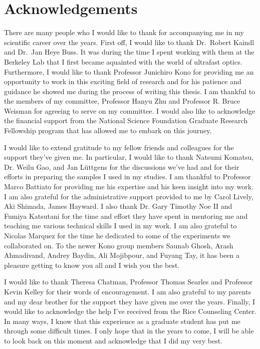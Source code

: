 \chapter*{Acknowledgements}

There are many people who I would like to thank for accompanying me in my scientific career over the years. First off, I would like to thank Dr.\ Robert Kaindl and Dr.\ Jan Heye Buss. It was during the time I spent working with them at the Berkeley Lab that I first became aquainted with the world of ultrafast optics. Furthermore, I would like to thank Professor Junichiro Kono for providing me an opportunity to work in this exciting field of research and for his patience and guidance he showed me during the process of writing this thesis. I am thankful to the members of my committee, Professor Hanyu Zhu and Professor R. Bruce Weisman for agreeing to serve on my committee. I would also like to acknowledge the financial support from the National Science Foundation Graduate Research Fellowship program that has allowed me to embark on this journey.

I would like to extend gratitude to my fellow friends and colleagues for the support they've given me. In particular, I would like to thank Natsumi Komatsu, Dr. Weilu Gao, and Jan L{\"u}ttgens for the discussions we've had and for their efforts in preparing the samples I used in my studies. I am thankful to Professor Marco Battiato for providing me his expertise and his keen insight into my work. I am also grateful for the administrative support provided to me by Carol Lively, Aki Shimada, James Hayward. I also thank Dr. Gary Timothy Noe II and Fumiya Katsutani for the time and effort they have spent in mentoring me and teaching me various technical skills I used in my work. I am also grateful to Nicolas Marquez for the time he dedicated to some of the experiments we collaborated on. To the newer Kono group members Saunab Ghosh, Arash Ahmadivand, Andrey Baydin, Ali Mojibpour, and Fuyang Tay, it has been a pleasure getting to know you all and I wish you the best.

I would like to thank Theresa Chatman, Professor Thomas Searles and Professor Kevin Kelley for their words of encouragement. I am also grateful to my parents and my dear brother for the support they have given me over the years. Finally, I would like to acknowledge the help I've received from the Rice Counseling Center. In many ways, I know that this experience as a graduate student has put me through some difficult times. I only hope that in the years to come, I will be able to look back on this moment and acknowledge that I did my very best.
